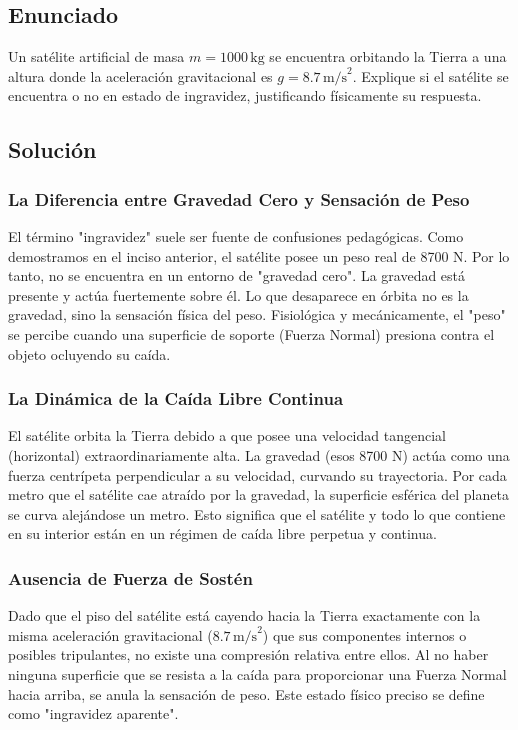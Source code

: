 \documentclass[12pt]{article}
\begin{document}
\newpage

\subsection*{Enunciado}
Un satélite artificial de masa $m = 1000 \, \text{kg}$ se encuentra orbitando la Tierra a una altura donde la aceleración gravitacional es $g = 8.7 \, \text{m/s}^2$. Explique si el satélite se encuentra o no en estado de ingravidez, justificando físicamente su respuesta.

\subsection*{Solución}

\subsubsection*{La Diferencia entre Gravedad Cero y Sensación de Peso}
El término "ingravidez" suele ser fuente de confusiones pedagógicas. Como demostramos en el inciso anterior, el satélite posee un peso real de 8700 N. Por lo tanto, no se encuentra en un entorno de "gravedad cero". La gravedad está presente y actúa fuertemente sobre él. Lo que desaparece en órbita no es la gravedad, sino la sensación física del peso. Fisiológica y mecánicamente, el "peso" se percibe cuando una superficie de soporte (Fuerza Normal) presiona contra el objeto ocluyendo su caída.

\subsubsection*{La Dinámica de la Caída Libre Continua}
El satélite orbita la Tierra debido a que posee una velocidad tangencial (horizontal) extraordinariamente alta. La gravedad (esos 8700 N) actúa como una fuerza centrípeta perpendicular a su velocidad, curvando su trayectoria. Por cada metro que el satélite cae atraído por la gravedad, la superficie esférica del planeta se curva alejándose un metro. Esto significa que el satélite y todo lo que contiene en su interior están en un régimen de caída libre perpetua y continua.

\subsubsection*{Ausencia de Fuerza de Sostén}
Dado que el piso del satélite está cayendo hacia la Tierra exactamente con la misma aceleración gravitacional ($8.7 \, \text{m/s}^2$) que sus componentes internos o posibles tripulantes, no existe una compresión relativa entre ellos. Al no haber ninguna superficie que se resista a la caída para proporcionar una Fuerza Normal hacia arriba, se anula la sensación de peso. Este estado físico preciso se define como "ingravidez aparente".
\end{document}
